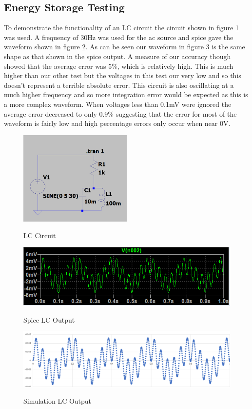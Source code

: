 \documentclass{article}
\begin{document}
\subsection{Energy Storage Testing}
To demonstrate the functionality of an LC circuit the circuit shown in figure \ref{fig:LCCircuit1} was used. A frequency of 30Hz was used for the ac source and spice gave the waveform shown in figure \ref{fig:LCSpice1}. As can be seen our waveform in figure \ref{fig:LCOutput1} is the same shape as that shown in the spice output. A measure of our accuracy though showed that the average error was 5\%, which is relatively high. This is much higher than our other test but the voltages in this test our very low and so this doesn't represent a terrible absolute error. This circuit is also oscillating at a much higher frequency and so more integration error would be expected as this is a more complex waveform. When voltages less than 0.1mV were ignored the average error decreased to only 0.9\% suggesting that the error for most of the waveform is fairly low and high percentage errors only occur when near 0V. 
\begin{figure}[h]
    \caption{LC Circuit}
    \centering
    \includegraphics[width=0.5\textwidth]{images/LCCircuit1.png}
    \label{fig:LCCircuit1}
\end{figure}
\begin{figure}[h]
    \caption{Spice LC Output}
    \centering
    \includegraphics[width=1\textwidth]{images/LCSpice1.png}
    \label{fig:LCSpice1}
\end{figure}
\begin{figure}[h]
    \caption{Simulation LC Output}
    \centering
    \includegraphics[width=1\textwidth]{images/LCOutput1.png}
    \label{fig:LCOutput1}
\end{figure}
\end{document}
